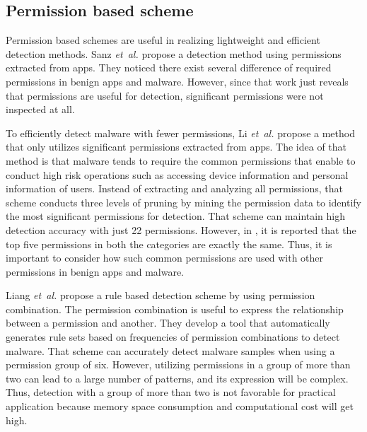 \documentclass{ieeeaccess}
\newcommand{\etal}{\textit{et~al.}}
\begin{document}
\subsection{Permission based scheme}
Permission based schemes are useful in realizing lightweight and efficient detection methods.
Sanz \etal \cite{sanz2013puma} propose a detection method using permissions extracted from apps.  
They noticed there exist several difference of required permissions in benign apps and malware.
However, since that work just reveals that permissions are useful for detection, significant permissions were not inspected at all.

To efficiently detect malware with fewer permissions, Li \etal \cite{li2018significant} propose a method that only utilizes significant permissions extracted from apps.
The idea of that method is that malware tends to require the common permissions that enable to conduct high risk operations such as accessing device information and personal information of users.
Instead of extracting and analyzing all permissions, that scheme conducts three levels of pruning by mining the permission data to identify the most significant permissions for detection.
That scheme can maintain high detection accuracy with just 22 permissions.
However, in \cite{sanz2013puma}, it is reported that the top five permissions in both the categories are exactly the same.
Thus, it is important to consider how such common permissions are used with other permissions in benign apps and malware.

Liang \etal \cite{liang2014permission} propose a rule based detection scheme by using permission combination.
The permission combination is useful to express the relationship between a permission and another.
They develop a tool that automatically generates rule sets based on frequencies of permission combinations to detect malware.
That scheme can accurately detect malware samples when using a permission group of six.
However, utilizing permissions in a group of more than two can lead to a large number of patterns, and its expression will be complex.
Thus, detection with a group of more than two is not favorable for practical application because memory space consumption and computational cost will get high.
\end{document}
